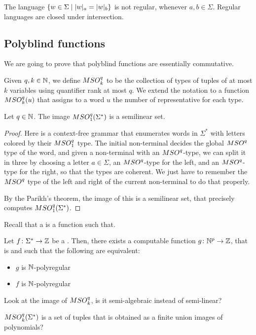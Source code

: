 \begin{fact}
    \label{regular:fact}
    The language $\setof{ w \in \Sigma}{ \card[a]{w} = \card[b]{w}}$
    is not regular, whenever $a,b \in \Sigma$.
    Regular languages are closed under intersection.
\end{fact}

\subsection{Polyblind functions}

We are going to prove that polyblind functions are essentially
commutative.

\AP Given $q,k \in \mathbb{N}$, we define $\MSO^q_k$ to be the collection of types of
tuples of at most $k$ variables using quantifier rank at most $q$. We extend
the notation to a function $\MSO^q_k (u)$ that assigns to a word $u$ the number
of representative for each type.

\begin{lemma}
    Let $q \in \mathbb{N}$. The image
    $\MSO^q_1(\Sigma^*)$ is a semilinear set.
\end{lemma}
\begin{proof}
    Here is a context-free grammar that enumerates words
    in $\Sigma^*$ with letters colored by their $\MSO^q_1$ type.
    The initial non-terminal decides the global $\MSO^q$ type of the word,
    and given a non-terminal with an $\MSO^q$-type, we can split it in three
    by choosing a letter $a \in \Sigma$, an $\MSO^q$-type for the left,
    and an $\MSO^q$-type for the right, so that the types are coherent.
    We just have to remember the $\MSO^q$ type of the left and right
    of the current non-terminal to do that properly.

    By the Parikh’s theorem, the image of this is a semilinear set, that
    precisely computes $\MSO^q_1(\Sigma^*)$.
\end{proof}

\AP
Recall that a  is a function such that.

\begin{lemma}
    Let $f \colon \Sigma^* \to \mathbb{Z}$ be a .
    Then, there exists a computable function $g \colon \mathbb{N}^p \to \mathbb{Z}$,
    that is  and such that the following are equivalent:
    \begin{itemize}
        \item $g$ is $\mathbb{N}$-polyregular
        \item $f$ is $\mathbb{N}$-polyregular
    \end{itemize}
\end{lemma}

\AP
Look at the image of $\MSO^q_k$, is it semi-algebraic instead of semi-linear?
\begin{lemma}
    $\MSO^q_k(\Sigma^*)$ is a set of tuples that is obtained as a finite union 
    images of polynomials?
\end{lemma}
